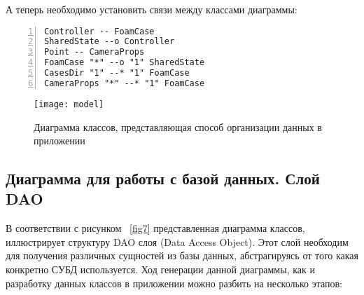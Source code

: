\documentclass[14pt]{extreport}
\begin{document}
А теперь необходимо установить связи между классами диаграммы: 
\begin{Verbatim}[numbers=left,xleftmargin=5mm,fontsize=\small]
Controller -- FoamCase
SharedState --o Controller
Point -- CameraProps
FoamCase "*" --o "1" SharedState
CasesDir "1" --* "1" FoamCase
CameraProps "*" --* "1" FoamCase
\end{Verbatim}

\begin{figure}[H]
\centerline{\texttt{[image: model]}}
\caption{Диаграмма классов, представляющая способ организации данных в приложении}
\label{fig6}
\end{figure}


\subsection{Диаграмма для работы с базой данных. Слой DAO}
В соответствии с рисунком ~\ref{fig7} представленная диаграмма классов, иллюстрирует структуру DAO слоя (Data Access Object). Этот слой необходим для получения различных сущностей из базы данных, абстрагируясь от того какая конкретно СУБД используется. 
Ход генерации данной диаграммы, как и разработку данных классов в приложении можно разбить на несколько этапов:
\end{document}
